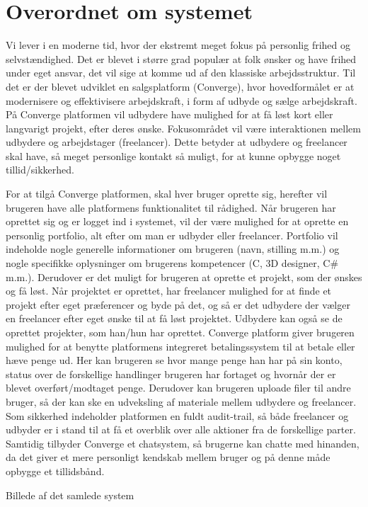 \chapter{Overordnet om systemet}

Vi lever i en moderne tid, hvor der ekstremt meget fokus på personlig frihed og selvstændighed. Det er blevet i større grad populær at folk ønsker og have frihed under eget ansvar, det vil sige at komme ud af den klassiske arbejdsstruktur. Til det er der blevet udviklet en salgsplatform (Converge), hvor hovedformålet er at modernisere og effektivisere arbejdskraft, i form af udbyde og sælge arbejdskraft.  På Converge platformen vil udbydere have mulighed for at få løst kort eller langvarigt projekt, efter deres ønske. Fokusområdet vil være interaktionen mellem udbydere og arbejdstager (freelancer).  Dette betyder at udbydere og freelancer skal have, så meget personlige kontakt så muligt, for at kunne opbygge noget tillid/sikkerhed. 


For at tilgå Converge platformen, skal hver bruger oprette sig, herefter vil brugeren have alle platformens funktionalitet til rådighed. Når brugeren har oprettet sig og er logget ind i systemet, vil der være mulighed for at oprette en personlig portfolio, alt efter om man er udbyder eller freelancer. Portfolio vil indeholde nogle generelle informationer om brugeren (navn, stilling m.m.) og nogle specifikke oplysninger om brugerens kompetencer (C, 3D designer, C\# m.m.).  Derudover er det muligt for brugeren at oprette et projekt, som der ønskes og få løst. Når projektet er oprettet, har freelancer mulighed for at finde et projekt efter eget præferencer og byde på det, og så er det udbydere der vælger en freelancer efter eget ønske til at få løst projektet. Udbydere kan også se de oprettet projekter, som han/hun har oprettet.  Converge platform giver brugeren mulighed for at benytte platformens integreret betalingssystem til at betale eller hæve penge ud. Her kan brugeren se hvor mange penge han har på sin konto, status over de forskellige handlinger brugeren har fortaget og hvornår der er blevet overført/modtaget penge. Derudover kan brugeren uploade filer til andre bruger, så der kan ske en udveksling af materiale mellem udbydere og freelancer. Som sikkerhed indeholder platformen en fuldt audit-trail, så både freelancer og udbyder er i stand til at få et overblik over alle aktioner fra de forskellige parter. Samtidig tilbyder Converge et chatsystem, så brugerne kan chatte med hinanden, da det giver et mere personligt kendskab mellem bruger og på denne måde opbygge et tillidsbånd.   


Billede af det samlede system
